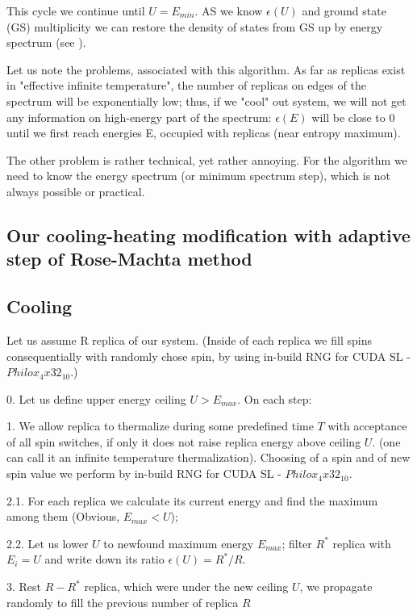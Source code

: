 \documentclass[aps,prl,amssymb,amsmath,twocolumn,floatfix]{revtex4}
\begin{document}
This cycle we continue until $U=E_{min}$. AS we know $\epsilon(U)$ and ground state (GS) multiplicity we can restore the density of states from GS up by energy spectrum (see \postcalc).

Let us note the problems, associated with this algorithm. As far as replicas exist in "effective infinite temperature",  the number of replicas on edges of the spectrum will be exponentially low; thus, if we "cool" out system, we will not get any information on high-energy part of the spectrum: $\epsilon(E)$ will be close to 0 until we first reach energies E, occupied with replicas (near entropy maximum).

The other problem is rather technical, yet rather annoying. For the algorithm we need to know the energy spectrum (or minimum spectrum step), which is not always possible or practical.


\subsection{Our cooling-heating modification with adaptive step of Rose-Machta method}

\subsection{Cooling}

Let us assume R replica of our system. (Inside of each replica we fill spins consequentially with randomly chose spin, by using in-build RNG for CUDA SL - $Philox_4x32_10$.)

0. Let us define upper energy ceiling $U > E_{max}$. On each step:

1. We allow replica to thermalize during some predefined time $T$ with acceptance of all spin switches, if only it does not raise replica energy above ceiling $U$. (one can call it an infinite temperature thermalization). Choosing of a spin and of new spin value we perform by in-build RNG for CUDA SL - $Philox_4x32_10$.

2.1. For each replica we calculate its current energy and find the maximum among them (Obvious, $E_{max} < U$);

2.2. Let us lower $U$ to newfound maximum energy $E_{max}$; filter $R^*$ replica with $E_i = U$ and write down its ratio $\epsilon(U) = R^*/R$.

3. Rest $R-R^*$ replica, which were under the new ceiling $U$, we propagate randomly to fill the previous number of replica $R$
\end{document}
